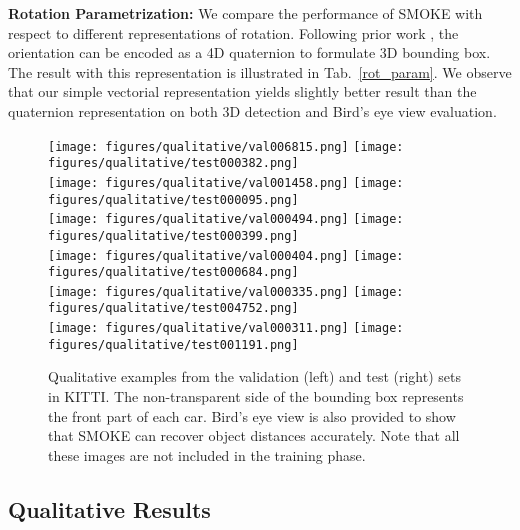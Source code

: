 \documentclass[10pt,twocolumn,letterpaper]{article}
\renewcommand{\paragraph}[1]{

        \vspace{3pt}
	\noindent\textbf{#1}}
\begin{document}
    \paragraph{Rotation Parametrization:} 
    We compare the performance of SMOKE with respect to different representations of rotation. Following prior work \cite{roi10d_2019, monodis_2019}, the orientation can be encoded as a 4D quaternion to formulate 3D bounding box. The result with this representation is illustrated in Tab.~\ref{rot_param}. We observe that our simple vectorial representation yields slightly better result than the quaternion representation on both 3D detection and Bird's eye view evaluation.

    \begin{figure*}[t]
        \centering
        \texttt{[image: figures/qualitative/val006815.png]}
        \texttt{[image: figures/qualitative/test000382.png]}\\ 
        \texttt{[image: figures/qualitative/val001458.png]}
        \texttt{[image: figures/qualitative/test000095.png]}\\
        \texttt{[image: figures/qualitative/val000494.png]}
        \texttt{[image: figures/qualitative/test000399.png]}\\ 
        \texttt{[image: figures/qualitative/val000404.png]}
        \texttt{[image: figures/qualitative/test000684.png]}\\
        \texttt{[image: figures/qualitative/val000335.png]}
        \texttt{[image: figures/qualitative/test004752.png]}\\
        \texttt{[image: figures/qualitative/val000311.png]}
        \texttt{[image: figures/qualitative/test001191.png]}\\
        
        \caption{Qualitative examples from the  validation (left) and test (right) sets in KITTI. The non-transparent side of the bounding box represents the front part of each car. Bird's eye view is also provided to show that SMOKE can recover object distances accurately. Note that all these images are not included in the training phase.}
        \label{quantitative_results}
    \end{figure*}
\subsection{Qualitative Results} 
    
\end{document}
